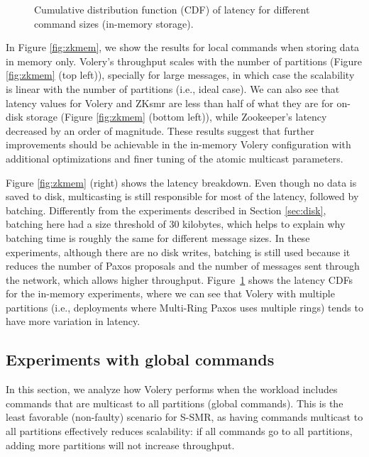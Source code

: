 \begin{figure}
\begin{minipage}[b]{0.3333\linewidth}
\end{minipage}
\caption{Cumulative distribution function (CDF) of latency for different command sizes (in-memory storage).}
\label{fig:zkmemcdf}
\end{figure}

In Figure \ref{fig:zkmem}, we show the results for local commands when storing data in memory only. 
Volery's throughput scales with the number of partitions (Figure \ref{fig:zkmem} (top left)), specially for large messages, in which case the scalability is linear with the number of partitions (i.e., ideal case). 
We can also see that latency values for Volery and ZKsmr are less than half of what they are for on-disk storage (Figure \ref{fig:zkmem} (bottom left)), while Zookeeper's latency decreased by an order of magnitude. 
These results suggest that further improvements should be achievable in the in-memory Volery configuration with additional optimizations and finer tuning of the atomic multicast parameters.

Figure \ref{fig:zkmem} (right) shows the latency breakdown. 
Even though no data is saved to disk, multicasting is still responsible for most of the latency, followed by batching. 
Differently from the experiments described in Section \ref{sec:disk}, batching here had a size threshold of 30 kilobytes, which helps to explain why batching time is roughly the same for different message sizes. 
In these experiments, although there are no disk writes, batching is still used because it reduces the number of Paxos proposals and the number of messages sent through the network, which allows higher throughput. 
Figure~\ref{fig:zkmemcdf} shows the latency CDFs for the in-memory experiments, where we can see that Volery with multiple partitions (i.e., deployments where Multi-Ring Paxos uses multiple rings) tends to have more variation in latency.

\subsection{Experiments with global commands}
\label{sec:global}

In this section, we analyze how Volery performs when the workload includes commands that are multicast to all partitions (global commands). This is the least favorable (non-faulty) scenario for S-SMR, as having commands multicast to all partitions effectively reduces scalability: if all commands go to all partitions, adding more partitions will not increase throughput.

